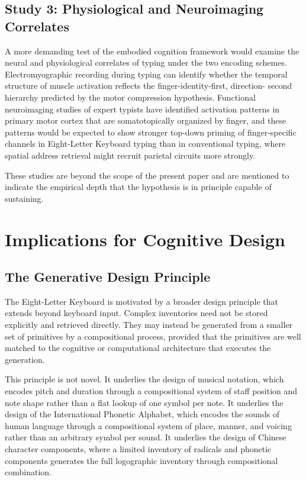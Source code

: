 \documentclass[12pt,a4paper]{article}
\theoremstyle{plain}
\theoremstyle{definition}
\theoremstyle{remark}
\begin{document}
\subsection{Study 3: Physiological and Neuroimaging Correlates}

A more demanding test of the embodied cognition framework would examine the
neural and physiological correlates of typing under the two encoding schemes.
Electromyographic recording during typing can identify whether the temporal
structure of muscle activation reflects the finger-identity-first, direction-
second hierarchy predicted by the motor compression hypothesis. Functional
neuroimaging studies of expert typists have identified activation patterns in
primary motor cortex that are somatotopically organized by finger, and these
patterns would be expected to show stronger top-down priming of finger-specific
channels in Eight-Letter Keyboard typing than in conventional typing, where
spatial address retrieval might recruit parietal circuits more strongly.

These studies are beyond the scope of the present paper and are mentioned to
indicate the empirical depth that the hypothesis is in principle capable of
sustaining.

\section{Implications for Cognitive Design}

\subsection{The Generative Design Principle}

The Eight-Letter Keyboard is motivated by a broader design principle that
extends beyond keyboard input. Complex inventories need not be stored explicitly
and retrieved directly. They may instead be generated from a smaller set of
primitives by a compositional process, provided that the primitives are well
matched to the cognitive or computational architecture that executes the
generation.

This principle is not novel. It underlies the design of musical notation, which
encodes pitch and duration through a compositional system of staff position and
note shape rather than a flat lookup of one symbol per note. It underlies the
design of the International Phonetic Alphabet, which encodes the sounds of human
language through a compositional system of place, manner, and voicing rather
than an arbitrary symbol per sound. It underlies the design of Chinese character
components, where a limited inventory of radicals and phonetic components
generates the full logographic inventory through compositional combination.
\end{document}
